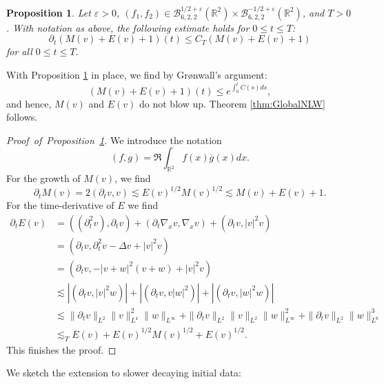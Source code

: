\documentclass{amsart}
\newtheorem{proposition}[theorem]{Proposition}
\theoremstyle{definition}
\newcommand{\R}{\mathbb{R}}
\newcommand {\Rtwo}{\mathbb{R}^{2}}
\numberwithin{equation}{section}
\begin{document}
\begin{proposition}
\label{prop:GrowthBoundMassEnergy}
Let $\varepsilon > 0$, $(f_1,f_2) \in \mathcal{B}^{1/2+\varepsilon}_{6,2,2}(\Rtwo) \times \mathcal{B}^{-1/2+\varepsilon}_{6,2,2}(\Rtwo)$, and $T>0$. With notation as above, the following estimate holds for $0 \leq t \leq T$:
\begin{equation*}
\partial_t (M(v) + E(v) + 1)(t) \leq C_T ( M(v) + E(v) + 1)
\end{equation*}
for all $0 \leq t \leq T$.
\end{proposition}
With Proposition \ref{prop:GrowthBoundMassEnergy} in place, we find by Gr\o nwall's argument:
\begin{equation*}
(M(v) + E(v) + 1)(t) \leq e^{\int_0^t C(s) ds},
\end{equation*}
and hence, $M(v)$ and $E(v)$ do not blow up. Theorem \ref{thm:GlobalNLW} follows.
\begin{proof}[Proof~of~Proposition~\ref{prop:GrowthBoundMassEnergy}]
We introduce the notation
\begin{equation*}
(f,g) = \Re \int_{\R^2} f(x) \overline{g}(x) dx.
\end{equation*}
For the growth of $M(v)$, we find
\begin{equation*}
\partial_t M(v) = 2(\partial_t v,v) \lesssim E(v)^{1/2} M(v)^{1/2} \lesssim M(v) + E(v) + 1.
\end{equation*}
For the time-derivative of $E$ we find
\begin{equation*}
\begin{split}
\partial_t E(v) &= ((\partial_t^2 v), \partial_t v) + (\partial_t \nabla_x v, \nabla_x v) + (\partial_t v, |v|^2 v) \\
&= (\partial_t v, \partial_t^2 v - \Delta v + |v|^2 v) \\
&= (\partial_t v, - |v+w|^2 (v+w) + |v|^2 v) \\
&\lesssim |(\partial_t v, |v|^2 w)| + |(\partial_t v, v |w|^2)| + |(\partial_t v, |w|^2 w)| \\
&\lesssim \| \partial_t v \|_{L^2} \| v \|_{L^4}^{2} \| w \|_{L^\infty} + \| \partial_t v \|_{L^2} \| v \|_{L^2} \| w \|_{L^\infty}^2 + \| \partial_t v \|_{L^2} \| w \|_{L^6}^3 \\
&\lesssim_T E(v) + E(v)^{1/2} M(v)^{1/2} + E(v)^{1/2}.
\end{split}
\end{equation*}
This finishes the proof.
\end{proof}
We sketch the extension to slower decaying initial data:
\end{document}
